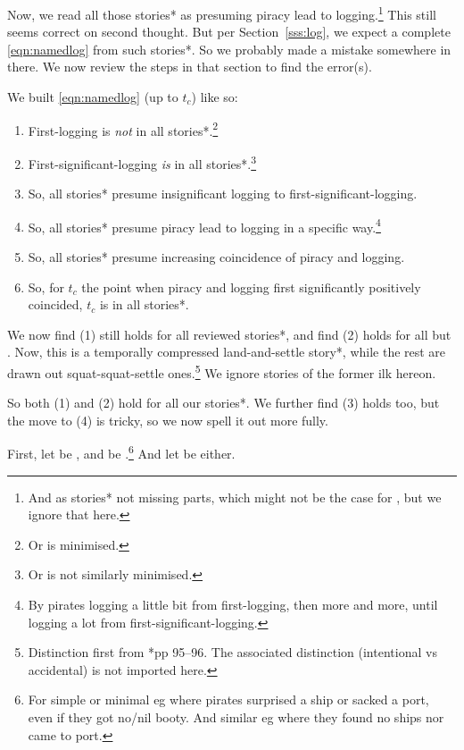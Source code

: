 		Now, we read all those stories* as presuming piracy lead to logging.\footnote{And as stories* not missing parts, which might not be the case for , but we ignore that here.} This still seems correct on second thought. But per Section~\ref{sss:log}, we expect a complete \ref{eqn:namedlog} from such stories*. So we probably made a mistake somewhere in there. We now review the steps in that section to find the error(s).
		\begin{steps}
		We built \ref{eqn:namedlog} (up to \(t_c\)) like so:
		\begin{enumerate}
		\item First-logging is \emph{not} in all stories*.\footnote{Or is minimised.}
		\item First-significant-logging \emph{is} in all stories*.\footnote{Or is not similarly minimised.}
		\item So, all stories* presume insignificant logging to first-significant-logging.
		\item So, all stories* presume piracy lead to logging in a specific way.\footnote{By pirates logging a little bit from first-logging, then more and more, until logging a lot from first-significant-logging.}
		\item So, all stories* presume increasing coincidence of piracy and logging.
		\item So, for \(t_c\) the point when piracy and logging first significantly positively coincided, \(t_c\) is in all stories*.
		\qedhere %
		\end{enumerate}
		\end{steps}
		We now find (1) still holds for all reviewed stories*, and find (2) holds for all but . Now, this is a temporally compressed land-and-settle story*, while the rest are drawn out squat-squat-settle ones.\footnote{Distinction first from \cite{cam11}*{pp 95--96}. The associated distinction (intentional vs accidental) is not imported here.} We ignore stories of the former ilk hereon.
		
		So both (1) and (2) hold for all our stories*. We further find (3) holds too, but the move to (4) is tricky, so we now spell it out more fully.
		
		First, let  be , and  be .\footnote{For simple or minimal  eg where pirates surprised a ship or sacked a port, even if they got no/nil booty. And similar  eg where they found no ships nor came to port.} And let  be either.
		
